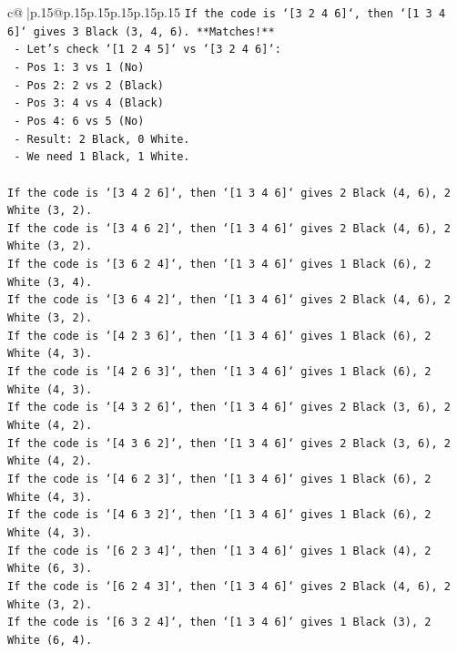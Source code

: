 \documentclass{article}
\begin{document}
{\begin{supertabular}{c@{$\;$}|p{.15\linewidth}@{}p{.15\linewidth}p{.15\linewidth}p{.15\linewidth}p{.15\linewidth}p{.15\linewidth}}
{{{\texttt{If the code is `{[}3 2 4 6{]}`, then `{[}1 3 4 6{]}` gives 3 Black (3, 4, 6). **Matches!**} \\
\texttt{    {-} Let's check `{[}1 2 4 5{]}` vs `{[}3 2 4 6{]}`:} \\
\texttt{        {-} Pos 1: 3 vs 1 (No)} \\
\texttt{        {-} Pos 2: 2 vs 2 (Black)} \\
\texttt{        {-} Pos 3: 4 vs 4 (Black)} \\
\texttt{        {-} Pos 4: 6 vs 5 (No)} \\
\texttt{        {-} Result: 2 Black, 0 White.} \\
\texttt{    {-} We need 1 Black, 1 White.} \\
\\ 
\texttt{If the code is `{[}3 4 2 6{]}`, then `{[}1 3 4 6{]}` gives 2 Black (4, 6), 2 White (3, 2).} \\
\texttt{If the code is `{[}3 4 6 2{]}`, then `{[}1 3 4 6{]}` gives 2 Black (4, 6), 2 White (3, 2).} \\
\texttt{If the code is `{[}3 6 2 4{]}`, then `{[}1 3 4 6{]}` gives 1 Black (6), 2 White (3, 4).} \\
\texttt{If the code is `{[}3 6 4 2{]}`, then `{[}1 3 4 6{]}` gives 2 Black (4, 6), 2 White (3, 2).} \\
\texttt{If the code is `{[}4 2 3 6{]}`, then `{[}1 3 4 6{]}` gives 1 Black (6), 2 White (4, 3).} \\
\texttt{If the code is `{[}4 2 6 3{]}`, then `{[}1 3 4 6{]}` gives 1 Black (6), 2 White (4, 3).} \\
\texttt{If the code is `{[}4 3 2 6{]}`, then `{[}1 3 4 6{]}` gives 2 Black (3, 6), 2 White (4, 2).} \\
\texttt{If the code is `{[}4 3 6 2{]}`, then `{[}1 3 4 6{]}` gives 2 Black (3, 6), 2 White (4, 2).} \\
\texttt{If the code is `{[}4 6 2 3{]}`, then `{[}1 3 4 6{]}` gives 1 Black (6), 2 White (4, 3).} \\
\texttt{If the code is `{[}4 6 3 2{]}`, then `{[}1 3 4 6{]}` gives 1 Black (6), 2 White (4, 3).} \\
\texttt{If the code is `{[}6 2 3 4{]}`, then `{[}1 3 4 6{]}` gives 1 Black (4), 2 White (6, 3).} \\
\texttt{If the code is `{[}6 2 4 3{]}`, then `{[}1 3 4 6{]}` gives 2 Black (4, 6), 2 White (3, 2).} \\
\texttt{If the code is `{[}6 3 2 4{]}`, then `{[}1 3 4 6{]}` gives 1 Black (3), 2 White (6, 4).} \\
}}}
\end{supertabular}}
\end{document}

